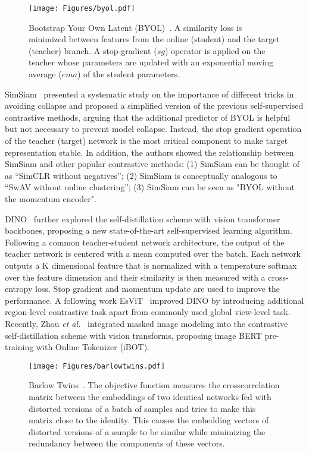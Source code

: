 \documentclass[lettersize,journal]{IEEEtran}
\newcommand{\etal}{\textit{et al.}}
\begin{document}
\begin{figure}
\centering
\texttt{[image: Figures/byol.pdf]}
\caption[BYOL]{Bootstrap Your Own Latent (BYOL)~\cite{grill2020bootstrap}. A similarity loss is minimized between features from the online (student) and the target (teacher) branch. A stop-gradient ($sg$) operator is applied on the teacher whose parameters are updated with an exponential moving average ($ema$) of the student parameters.
}
\label{fig:BYOL}
\end{figure}

SimSiam~\cite{chen2021exploring} presented a systematic study on the importance of different tricks in avoiding collapse and proposed a simplified version of the previous self-supervised contrastive methods, arguing that the additional predictor of BYOL is helpful but not necessary to prevent model collapse. Instead, the stop gradient operation of the teacher (target) network is the most critical component to make target representation stable. In addition, the authors showed the relationship between SimSiam and other popular contrastive methods: (1) SimSiam can be thought of as “SimCLR without negatives”; (2)  SimSiam is conceptually analogous to “SwAV without online clustering”; (3) SimSiam can be seen as "BYOL without the momentum encoder".


DINO~\cite{caron2021emerging} further explored the self-distillation scheme with vision transformer backbones, proposing a new state-of-the-art self-supervised learning algorithm. Following a common teacher-student network architecture, the output of the teacher network is centered with a mean computed over the batch. Each network outputs a K dimensional feature that is normalized with a temperature softmax over the feature dimension and their similarity is then measured with a cross-entropy loss. Stop gradient and momentum update are used to improve the performance. A following work EsViT~\cite{li2021efficient} improved DINO by introducing additional region-level contrastive task apart from commonly used global view-level task. Recently, Zhou \etal~\cite{zhou2021ibot} integrated masked image modeling into the contrastive self-distillation scheme with vision transforms, proposing image BERT pre-training with Online Tokenizer (iBOT).

\begin{figure}
\centering
\texttt{[image: Figures/barlowtwins.pdf]}
\caption[Barlow Twins]{Barlow Twins~\cite{zbontar2021barlow}. The objective function measures the crosscorrelation matrix between the embeddings of two identical networks fed with distorted versions of a batch of samples and tries to make this matrix close to the identity. This causes the embedding vectors of distorted versions of a sample to be similar while minimizing the redundancy between the components of these vectors.}
\label{fig:BarlowTwins}
\end{figure}
\end{document}
